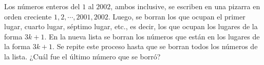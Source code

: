 Los números enteros del $1$ al $2002$, ambos inclusive, se escriben en una pizarra en orden creciente $1, 2, \cdots , 2001, 2002$. Luego, se borran los que ocupan el primer lugar, cuarto lugar, séptimo lugar, etc., es decir, los que ocupan los lugares de la forma $3k + 1$. En la nueva lista se borran los números que están en los lugares de la forma $3k + 1$. \newline 
Se repite este proceso hasta que se borran todos los números de la lista. ¿Cuál fue el último número que se borró?
